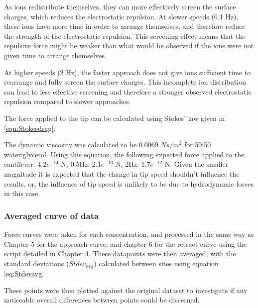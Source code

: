As ions redistribute themselves, they can more effectively screen the surface charges, which reduces the electrostatic repulsion. At slower speeds (0.1 Hz), these ions have more time in order to arrange themselves, and therefore reduce the strength of the electrostatic repulsion. This screening effect means that the repulsive force might be weaker than what would be observed if the ions were not given time to arrange themselves.

At higher speeds (2 Hz), the faster approach does not give ions sufficient time to rearrange and fully screen the surface charges. This incomplete ion distribution can lead to less effective screening and therefore a stronger observed electrostatic repulsion compared to slower approaches.

The force applied to the tip can be calculated using Stokes' law given in \ref{eqn:Stokesdrag}. \cite{bird2001transport}

The dynamic viscosity was calculated to be 0.0069 $Ns/m^2$ for 50:50 water:glycerol. \cite{Viscosity1} \cite{Viscosity2} Using this equation, the following expected force applied to the cantilever: $4.2e^{-14}$ N, 0.5Hz: $2.1e^{-13}$ N, 2Hz: $1.7e^{-12}$ N. Given the smaller magnitude it is expected that the change in tip speed shouldn't influence the results, or, the influence of tip speed is unlikely to be due to hydrodynamic forces in this case.

\subsubsection{Averaged curve of data}

Force curves were taken for each concentration, and processed in the same way as Chapter 5 for the approach curve, and chapter 6 for the retract curve using the script detailed in Chapter 4. These datapoints were then averaged, with the standard deviations ($Stdev_{avg}$) calculated between sites using equation \ref{eq:Stdevavg}

These points were then plotted against the original dataset to investigate if any noticeable overall differences between points could be discerned.

